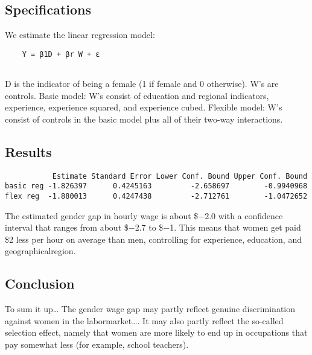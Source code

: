 \documentclass[]{article}
\begin{document}
\hypertarget{specifications}{%
\subsection{Specifications}\label{specifications}}

We estimate the linear regression model:

\begin{verbatim}
    Y = β1D + βr W + ε
    
\end{verbatim}

D is the indicator of being a female (1 if female and 0 otherwise). W's
are controls. Basic model: W's consist of education and regional
indicators, experience, experience squared, and experience cubed.
Flexible model: W's consist of controls in the basic model plus all of
their two-way interactions.

\hypertarget{results}{%
\subsection{Results}\label{results}}

\begin{verbatim}
           Estimate Standard Error Lower Conf. Bound Upper Conf. Bound
basic reg -1.826397      0.4245163         -2.658697        -0.9940968
flex reg  -1.880013      0.4247438         -2.712761        -1.0472652
\end{verbatim}

The estimated gender gap in hourly wage is about \$−2.0 with a
confidence interval that ranges from about \$−2.7 to \$−1. This means
that women get paid \$2 less per hour on average than men, controlling
for experience, education, and geographicalregion.

\hypertarget{conclusion}{%
\subsection{Conclusion}\label{conclusion}}

To sum it up\ldots{} The gender wage gap may partly reflect genuine
discrimination against women in the labormarket\ldots{}. It may also
partly reflect the so-called selection effect, namely that women are
more likely to end up in occupations that pay somewhat less (for
example, school teachers).
\end{document}
